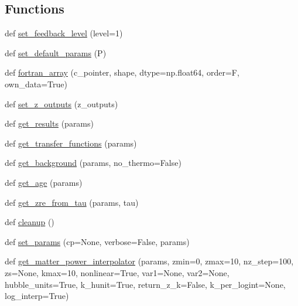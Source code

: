 \subsection*{Functions}
\begin{DoxyCompactItemize}
\item 
def \mbox{\hyperlink{namespacecamb_1_1camb_a3fc09103ab47ddd43da617de78b850d7}{set\+\_\+feedback\+\_\+level}} (level=1)
\item 
def \mbox{\hyperlink{namespacecamb_1_1camb_aee6dc5a42e1609d556dd05ae86af78ab}{set\+\_\+default\+\_\+params}} (P)
\item 
def \mbox{\hyperlink{namespacecamb_1_1camb_aa47148183bb7f90330a1e2f01b1063ff}{fortran\+\_\+array}} (c\+\_\+pointer, shape, dtype=np.\+float64, order=\textquotesingle{}F\textquotesingle{}, own\+\_\+data=True)
\item 
def \mbox{\hyperlink{namespacecamb_1_1camb_a1278c06959fade5c036b95daa28b8b11}{set\+\_\+z\+\_\+outputs}} (z\+\_\+outputs)
\item 
def \mbox{\hyperlink{namespacecamb_1_1camb_a7e83f6bc935783f6948a0e9c4a9d9ed1}{get\+\_\+results}} (params)
\item 
def \mbox{\hyperlink{namespacecamb_1_1camb_a460a9d6f9f2c11ad461f4dc26186372d}{get\+\_\+transfer\+\_\+functions}} (params)
\item 
def \mbox{\hyperlink{namespacecamb_1_1camb_af70bd70f702022b4caa64e9891b30435}{get\+\_\+background}} (params, no\+\_\+thermo=False)
\item 
def \mbox{\hyperlink{namespacecamb_1_1camb_af6991964b3a277d691e0197b9d715c11}{get\+\_\+age}} (params)
\item 
def \mbox{\hyperlink{namespacecamb_1_1camb_a7c5ffb7470d6adb95c92208185c5487b}{get\+\_\+zre\+\_\+from\+\_\+tau}} (params, tau)
\item 
def \mbox{\hyperlink{namespacecamb_1_1camb_a7ec5678be1930724bb5a1a179d51ae89}{cleanup}} ()
\item 
def \mbox{\hyperlink{namespacecamb_1_1camb_a79ab5665516443404a5fefc3a350b568}{set\+\_\+params}} (cp=None, verbose=False, params)
\item 
def \mbox{\hyperlink{namespacecamb_1_1camb_a1418924a33e3086804b351674832636c}{get\+\_\+matter\+\_\+power\+\_\+interpolator}} (params, zmin=0, zmax=10, nz\+\_\+step=100, zs=None, kmax=10, nonlinear=True, var1=None, var2=None, hubble\+\_\+units=True, k\+\_\+hunit=True, return\+\_\+z\+\_\+k=False, k\+\_\+per\+\_\+logint=None, log\+\_\+interp=True)
\end{DoxyCompactItemize}
